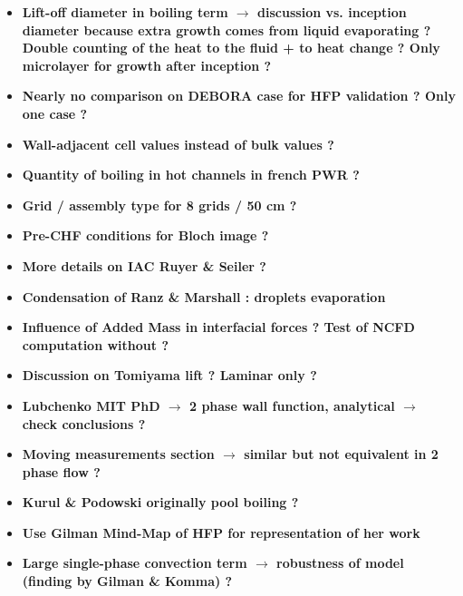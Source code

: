 \documentclass[8pt, a4paper]{article}
\begin{document}
\begin{itemize}
\item \textbf{Lift-off diameter in boiling term $\rightarrow$ discussion vs. inception diameter because extra growth comes from liquid evaporating ? Double counting of the heat to the fluid + to heat change ? Only microlayer for growth after inception ?}



\item \textbf{Nearly no comparison on DEBORA case for HFP validation ? Only one case ?}


\item \textbf{Wall-adjacent cell values instead of bulk values ?}


\item \textbf{Quantity of boiling in hot channels in french PWR ?}


\item \textbf{Grid / assembly type for 8 grids / 50 cm ?}


\item \textbf{Pre-CHF conditions for Bloch image ?}


\item \textbf{More details on IAC Ruyer \& Seiler ?}


\item \textbf{Condensation of Ranz \& Marshall : droplets evaporation}


\item \textbf{Influence of Added Mass in interfacial forces ? Test of NCFD computation without ?}


\item \textbf{Discussion on Tomiyama lift ? Laminar only ?}


\item \textbf{Lubchenko MIT PhD $\rightarrow$ 2 phase wall function, analytical $\rightarrow$ check conclusions ?}


\item \textbf{Moving measurements section $\rightarrow$ similar but not equivalent in 2 phase flow ?}


\item \textbf{Kurul \& Podowski originally pool boiling ?}



\item \textbf{Use Gilman Mind-Map of HFP for representation of her work}


\item \textbf{Large single-phase convection term $\rightarrow$ robustness of model (finding by Gilman \& Komma) ?}




\end{itemize}
\end{document}
